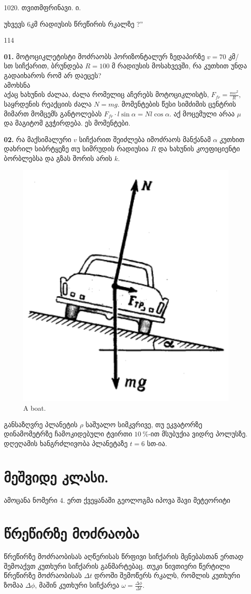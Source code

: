 \documentclass[a4paper]{book}
\begin{document}
1020. თვითმფრინავი. ი.

უხვევს 6კმ რადიუსის წრეწირის რკალზე ?''

114


	 \textbf{01.} მოტოციკლეტისტი მოძრაობს ჰორიზონტალურ ზედაპირზე $v = 70$ კმ/სთ სიჩქარით, ბრუნდება $R = 100$ მ რადიუსის მოსახვევში, რა კუთხით უნდა გადაიხაროს რომ არ დაეცეს? \\
	 ამოხსნა\\
	 აქაც ხახუნის ძალაა, ძალა რომელიც აჩერებს მოტოციკლისტს, $F_{fr} = \frac{m v^2}{R}$, საყრდენის რეაქციის ძალა $N = mg$. მომენტების წესი სიმძიმის ცენტრის მიმართ მომცემს განტოლებას $F_{fr}\cdot l \sin \alpha = N l \cos \alpha$. აქ მოცემული არაა $\mu$ და მაგიტომ გვჭირდება. ეს მომენტები.
	 
	\textbf{02.} რა მაქსიმალური $v$ სიჩქარით შეიძლება იმოძრაოს მანქანამ $\alpha$ კუთხით დახრილ სიბრტყეზე თუ სიმრუდის რადიუსია $R$ და ხახუნის კოეფიციენტი ბორბლებსა და გზას შორის არის $k$.
			\begin{figure}[H]
           \includegraphics[width=0.2\columnwidth]{figures/02}
           \caption{A boat.}
           \label{fig:02}
        \end{figure}

განსაზღვრე პლანეტის $\rho$ საშუალო სიმკვრივე, თუ ეკვატორზე დინამომეტრზე ჩამოკიდებული ტვირთი $10~\%$-ით მსუბუქია ვიდრე პოლუსზე. დღეღამის ხანგრძლივობა პლანეტაზე $t = 6$ სთ-ია.

\section{მეშვიდე კლასი.}
ამოცანა ნომერი 4. ერთ ქვეყანაში გეოლოგმა იპოვა შავი მეტეორიტი
	 
\section{წრეწირზე მოძრაობა}
წრეწირზე მოძრაობისას აღწერისას წრფივი სიჩქარის მცნებასთან ერთად შემოაქვთ კუთხური სიჩქარის განმარტებაც. თუკი ნივთიერი წერტილი წრეწირზე მოძრაობისას $\Delta t$ დროში შემოწერს რკალს, რომლის კუთხური ზომაა $\Delta \phi$, მაშინ კუთხური სიჩქარეა $\omega = \frac{\Delta \phi}{\Delta t}$.
\end{document}
